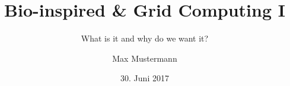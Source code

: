 \def\languages{main=ngerman,english}

\subject{%
  Seminar Software Engineering verteilter Systeme\\%
  Sommersemester 2017}

\title{Bio-inspired \& Grid Computing I}
\subtitle{What is it and why do we want it?}

\author{Max Mustermann}

\date{30. Juni 2017}

\publishers{%
  Betreuer: Martina Musterfrau\\%
  Softwaremethodik für verteilte Systeme (Prof. Bauer)\\%
  Universität Augsburg}

